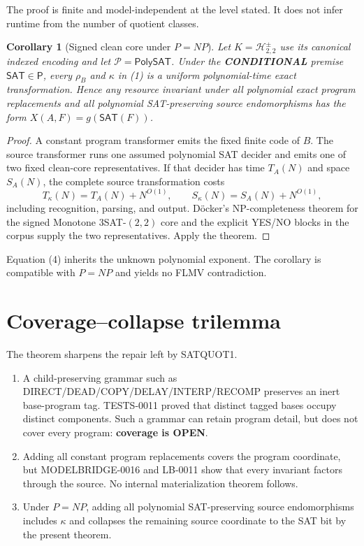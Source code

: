 \documentclass[11pt]{article}
\newtheorem{corollary}{Corollary}
\newcommand{\SAT}{\mathsf{SAT}}
\newcommand{\PolySAT}{\mathsf{PolySAT}}
\newcommand{\Hsigned}{\mathcal H^{\pm}_{2,2}}
\newcommand{\COND}{\textbf{CONDITIONAL}}
\begin{document}
The proof is finite and model-independent at the level stated.  It does not
infer runtime from the number of quotient classes.

\begin{corollary}[Signed clean core under $P=NP$]
Let $K=\Hsigned$ use its canonical indexed encoding and let
$\mathcal P=\PolySAT$.  Under the \COND{} premise $\SAT\in\mathsf P$,
every $\rho_B$ and $\kappa$ in (1) is a uniform polynomial-time exact
transformation.  Hence any resource invariant under all polynomial exact
program replacements and all polynomial SAT-preserving source endomorphisms
has the form $X(A,F)=g(\SAT(F))$.
\end{corollary}

\begin{proof}
A constant program transformer emits the fixed finite code of $B$.  The
source transformer runs one assumed polynomial SAT decider and emits one of
two fixed clean-core representatives.  If that decider has time $T_A(N)$ and
space $S_A(N)$, the complete source transformation costs
\[
 T_\kappa(N)=T_A(N)+N^{O(1)},\qquad
 S_\kappa(N)=S_A(N)+N^{O(1)},                             \tag{4}
\]
including recognition, parsing, and output.  D\"ocker's NP-completeness
theorem for the signed Monotone $3$SAT-$(2,2)$ core and the explicit YES/NO
blocks in the corpus supply the two representatives.  Apply the theorem.
\end{proof}

Equation (4) inherits the unknown polynomial exponent.  The corollary is
compatible with $P=NP$ and yields no FLMV contradiction.

\section{Coverage--collapse trilemma}

The theorem sharpens the repair left by SATQUOT1.
\begin{enumerate}[leftmargin=1.6em]
\item A child-preserving grammar such as DIRECT/DEAD/COPY/DELAY/INTERP/RECOMP
preserves an inert base-program tag.  TESTS-0011 proved that distinct tagged
bases occupy distinct components.  Such a grammar can retain program detail,
but does not cover every program: \textbf{coverage is OPEN}.
\item Adding all constant program replacements covers the program coordinate,
but MODELBRIDGE-0016 and LB-0011 show that every invariant factors through the
source.  No internal materialization theorem follows.
\item Under $P=NP$, adding all polynomial SAT-preserving source endomorphisms
includes $\kappa$ and collapses the remaining source coordinate to the SAT
bit by the present theorem.
\end{enumerate}
\end{document}
